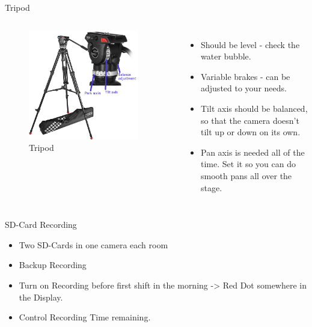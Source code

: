 \documentclass[aspectratio=169]{beamer}
\begin{document}
\begin{frame}{Tripod}
	\begin{columns}[T,onlytextwidth]
	\begin{figure} 
		\centering
		\includegraphics[width=0.9\textwidth]{images/tripod-complete.png}
		\caption{Tripod}
	\end{figure}
	
	\begin{itemize}
			\item Should be level - check the water bubble.
			\item Variable brakes - can be adjusted to your needs.
			\item Tilt axis should be balanced, so that the camera doesn't tilt up or down on its own.
			\item Pan axis is needed all of the time. Set it so you can do smooth pans all over the stage.
		\end{itemize}
	\end{columns}
\end{frame}

\begin{frame}{SD-Card Recording}
		\begin{itemize}
			\item Two SD-Cards in one camera each room
			\item Backup Recording
			\item Turn on Recording before first shift in the morning -> Red Dot somewhere in the Display.
			\item Control Recording Time remaining. 
		\end{itemize}
\end{frame}
\end{document}
